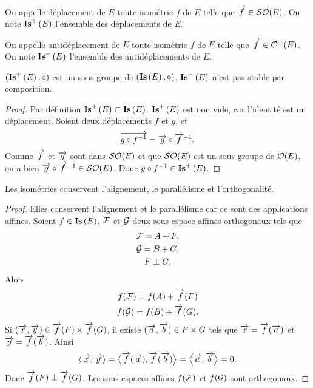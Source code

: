 \begin{defdef}
  On appelle déplacement de $E$ toute isométrie $f$ de $E$ telle que $\overrightarrow{f} \in \mathcal{SO}\!\left(E\right)$. On note $\mathbf{Is}^{+}\left(E\right)$ l'ensemble des déplacements de $E$.

  On appelle antidéplacement de $E$ toute isométrie $f$ de $E$ telle que $\overrightarrow{f} \in \mathcal{O}^{-}\!\left(E\right)$. On note $\mathbf{Is}^{-}\left(E\right)$ l'ensemble des antidéplacements de $E$.
\end{defdef}

\begin{prop}
  $(\mathbf{Is}^{+}\left(E\right), \circ)$ est un sous-groupe de $(\mathbf{Is}\left(E\right), \circ)$. $\mathbf{Is}^{-}\left(E\right)$ n'est pas stable par composition.
\end{prop}
\begin{proof}
  Par définition $\mathbf{Is}^{+}\left(E\right) \subset \mathbf{Is}\left(E\right)$. $\mathbf{Is}^{+}\left(E\right)$ est non vide, car l'identité est un déplacement. Soient deux déplacements $f$ et $g$, et
  \begin{equation}
    \overrightarrow{g \circ f^{-1}}=\overrightarrow{g} \circ \overrightarrow{f}^{-1}.
  \end{equation}
  Comme $\overrightarrow{f}$ et $\overrightarrow{g}$ sont dans $\mathcal{SO}\!\left(E\right)$ et que $\mathcal{SO}\!\left(E\right)$ est un sous-groupe de $\mathcal{O}\!\left(E\right)$, on a bien $\overrightarrow{g} \circ \overrightarrow{f}^{-1} \in \mathcal{SO}\!\left(E\right)$. Donc $g \circ f^{-1} \in \mathbf{Is}^{+}\left(E\right)$.
\end{proof}

\begin{prop}
  Les isométries conservent l'alignement, le parallélisme et l'orthogonalité.
\end{prop}
\begin{proof}
  Elles conservent l'alignement et le parallélisme car ce sont des applications affines. Soient $f \in \mathbf{Is}\left(E\right)$, $\mathcal{F}$ et $\mathcal{G}$ deux sous-espace affines orthogonaux tels que
  \begin{gather}
    \mathcal{F} = A+F, \\
    \mathcal{G} = B+G,\\
    F \perp G.
  \end{gather}
  Alors
  \begin{gather}
    f(\mathcal{F}) = f(A) + \overrightarrow{f}(F) \\
    f(\mathcal{G}) = f(B) + \overrightarrow{f}(G).
  \end{gather}
  Si $(\overrightarrow{x}, \overrightarrow{y}) \in \overrightarrow{f}(F) \times \overrightarrow{f}(G)$, il existe $(\overrightarrow{a}, \overrightarrow{b}) \in F \times G$ tels que $\overrightarrow{x}=\overrightarrow{f}(\overrightarrow{a})$  et $\overrightarrow{y}=\overrightarrow{f}(\overrightarrow{b})$. Ainsi
  \begin{equation}
    \left\langle{\overrightarrow{x}},{\overrightarrow{y}}\right\rangle = \left\langle{\overrightarrow{f}(\overrightarrow{a})},{\overrightarrow{f}(\overrightarrow{b})}\right\rangle = \left\langle{\overrightarrow{a}},{\overrightarrow{b}}\right\rangle =0.
  \end{equation}
  Donc $\overrightarrow{f}(F) \perp \overrightarrow{f}(G)$. Les sous-espaces affines $f(\mathcal{F})$ et $f(\mathcal{G})$ sont orthogonaux.
\end{proof}

